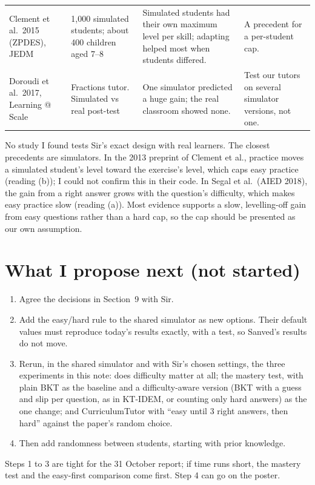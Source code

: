 \documentclass[11pt,a4paper]{article}
\begin{document}
{\begin{longtable}{>{\raggedright}p{2.7cm}>{\raggedright}p{3.1cm}>{\raggedright}p{5.4cm}>{\raggedright\arraybackslash}p{4.3cm}}
Clement et al.\ 2015 (ZPDES), JEDM & 1,000 simulated students; about 400 children aged 7--8 & Simulated students had their own maximum level per skill; adapting helped most when students differed. & A precedent for a per-student cap.\\
Doroudi et al.\ 2017, Learning @ Scale & Fractions tutor. Simulated vs real post-test & One simulator predicted a huge gain; the real classroom showed none. & Test our tutors on several simulator versions, not one.\\
\bottomrule
\end{longtable}}

No study I found tests Sir's exact design with real learners. The closest precedents are simulators. In the 2013 preprint of Clement et al., practice moves a simulated student's level toward the exercise's level, which caps easy practice (reading (b)); I could not confirm this in their code. In Segal et al.\ (AIED 2018), the gain from a right answer grows with the question's difficulty, which makes easy practice slow (reading (a)). Most evidence supports a slow, levelling-off gain from easy questions rather than a hard cap, so the cap should be presented as our own assumption.

\section{What I propose next (not started)}
\begin{enumerate}[leftmargin=*]
\item Agree the decisions in Section~9 with Sir.
\item Add the easy/hard rule to the shared simulator as new options. Their default values must reproduce today's results exactly, with a test, so Sanved's results do not move.
\item Rerun, in the shared simulator and with Sir's chosen settings, the three experiments in this note: does difficulty matter at all; the mastery test, with plain BKT as the baseline and a difficulty-aware version (BKT with a guess and slip per question, as in KT-IDEM, or counting only hard answers) as the one change; and CurriculumTutor with ``easy until 3 right answers, then hard'' against the paper's random choice.
\item Then add randomness between students, starting with prior knowledge.
\end{enumerate}
Steps 1 to 3 are tight for the 31 October report; if time runs short, the mastery test and the easy-first comparison come first. Step 4 can go on the poster.
\end{document}

